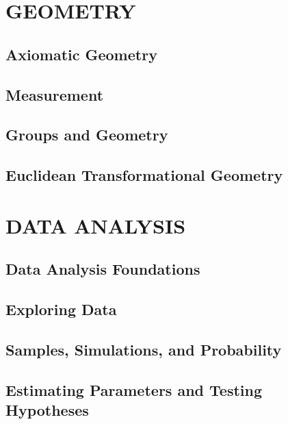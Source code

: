 \documentclass[
]{book}
\theoremstyle{definition}
\theoremstyle{definition}
\theoremstyle{definition}
\theoremstyle{remark}
\begin{document}
\hypertarget{part-geometry}{%
\part{GEOMETRY}\label{part-geometry}}

\hypertarget{ch:constructions}{%
\chapter{Axiomatic Geometry}\label{ch:constructions}}

\hypertarget{ch:measurement}{%
\chapter{Measurement}\label{ch:measurement}}

\hypertarget{ch:algebraic-geometry}{%
\chapter{Groups and Geometry}\label{ch:algebraic-geometry}}

\hypertarget{ch:transformations}{%
\chapter{Euclidean Transformational Geometry}\label{ch:transformations}}

\hypertarget{part-data-analysis}{%
\part{DATA ANALYSIS}\label{part-data-analysis}}

\hypertarget{ch:data1}{%
\chapter{Data Analysis Foundations}\label{ch:data1}}

\hypertarget{ch:data-explore}{%
\chapter{Exploring Data}\label{ch:data-explore}}

\hypertarget{ch:simulations}{%
\chapter{Samples, Simulations, and Probability}\label{ch:simulations}}

\hypertarget{ch:parameters}{%
\chapter{Estimating Parameters and Testing Hypotheses}\label{ch:parameters}}

  
\end{document}
